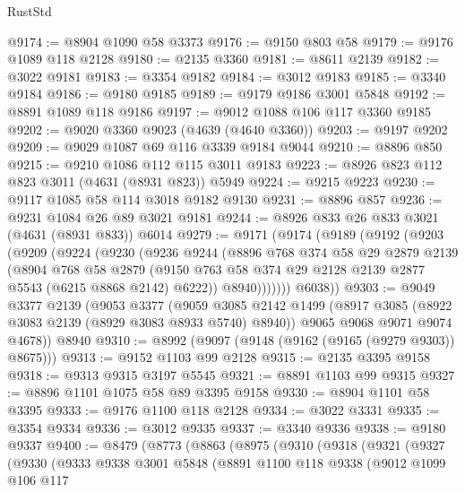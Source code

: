 \begin{lexlean}{RustStd}
\begin{coremodule}
{\begin{coremodule}
{{{{{{{{{{{{{{{{@9174 := @8904 @1090 @58 @3373
@9176 := @9150 @803 @58
@9179 := @9176 @1089 @118 @2128
@9180 := @2135 @3360
@9181 := @8611 @2139
@9182 := @3022 @9181
@9183 := @3354 @9182
@9184 := @3012 @9183
@9185 := @3340 @9184
@9186 := @9180 @9185
@9189 := @9179 @9186 @3001 @5848
@9192 := @8891 @1089 @118 @9186
@9197 := @9012 @1088 @106 @117 @3360 @9185
@9202 := @9020 @3360 @9023 (@4639 (@4640 @3360))
@9203 := @9197 @9202
@9209 := @9029 @1087 @69 @116 @3339 @9184 @9044
@9210 := @8896 @850
@9215 := @9210 @1086 @112 @115 @3011 @9183
@9223 := @8926 @823 @112 @823 @3011 (@4631 (@8931 @823)) @5949
@9224 := @9215 @9223
@9230 := @9117 @1085 @58 @114 @3018 @9182 @9130
@9231 := @8896 @857
@9236 := @9231 @1084 @26 @89 @3021 @9181
@9244 := @8926 @833 @26 @833 @3021 (@4631 (@8931 @833)) @6014
@9279 := @9171
    (@9174
      (@9189
        (@9192
          (@9203
            (@9209
              (@9224
                (@9230
                  (@9236
                    @9244
                    (@8896
                      @768
                      @374
                      @58
                      @29
                      @2879
                      @2139
                      (@8904
                        @768
                        @58
                        @2879
                        (@9150 @763 @58 @374 @29 @2128 @2139 @2877 @5543 (@6215 @8868 @2142) @6222))
                      @8940)))))))
        @6038))
@9303 := @9049
    @3377
    @2139
    (@9053
      @3377
      (@9059
        @3085
        @2142
        @1499
        (@8917 @3085 (@8922 @3083 @2139 (@8929 @3083 @8933 @5740) @8940))
        @9065
        @9068
        @9071
        @9074
        @4678))
    @8940
@9310 := @8992 (@9097 (@9148 (@9162 (@9165 (@9279 @9303)) @8675)))
@9313 := @9152 @1103 @99 @2128
@9315 := @2135 @3395 @9158
@9318 := @9313 @9315 @3197 @5545
@9321 := @8891 @1103 @99 @9315
@9327 := @8896 @1101 @1075 @58 @89 @3395 @9158
@9330 := @8904 @1101 @58 @3395
@9333 := @9176 @1100 @118 @2128
@9334 := @3022 @3331
@9335 := @3354 @9334
@9336 := @3012 @9335
@9337 := @3340 @9336
@9338 := @9180 @9337
@9400 := @8479
    (@8773
      (@8863
        (@8975
          (@9310
            (@9318
              (@9321
                (@9327
                  (@9330
                    (@9333
                      @9338
                      @3001
                      @5848
                      (@8891
                        @1100
                        @118
                        @9338
                        (@9012
                          @1099
                          @106
                          @117
}}}}}}}}}}}}}}}}
\end{coremodule}}
\end{coremodule}
\end{lexlean}
